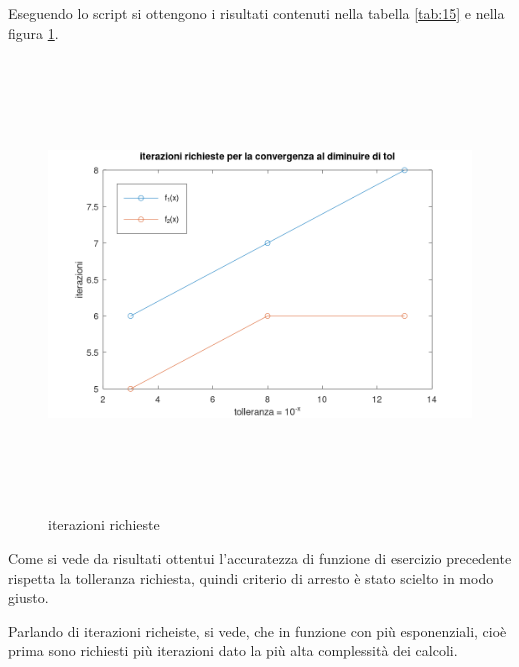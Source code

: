 Eseguendo lo script  si ottengono i risultati contenuti nella tabella \ref{tab:15}
e nella figura \ref{fig:es15}.
\begin{table}[ht]
    \centering
    \renewcommand\arraystretch{2}
    \caption{valori approssimati con i metodi di Newton, secanti e Steffensen}
    \label{tab:15}
\end{table}
\FloatBarrier
\begin{figure}[!ht]
    \centering
    \includegraphics[width=16cm,height=12cm,keepaspectratio]{capitolo3/es15_figure.png}
    \caption{iterazioni richieste}
    \label{fig:es15}
\end{figure}
\FloatBarrier
Come si vede da risultati ottentui l'accuratezza di funzione di esercizio precedente
rispetta la tolleranza richiesta, quindi criterio di arresto è stato scielto in modo giusto.

Parlando di iterazioni richeiste, si vede, che in funzione con più esponenziali, cioè prima
sono richiesti più iterazioni dato la più alta complessità dei calcoli.

